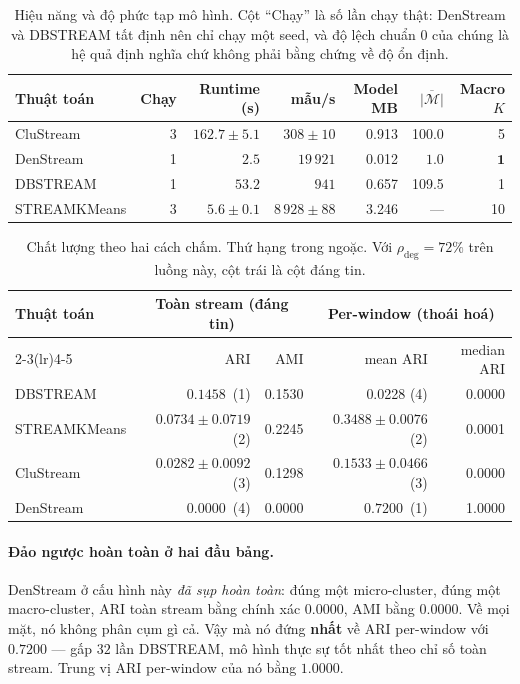 \documentclass[11pt,a4paper]{article}
\theoremstyle{remark}
\begin{document}
\begin{table}[htbp]
\centering
\small
\caption{Hiệu năng và độ phức tạp mô hình. Cột ``Chạy'' là số lần chạy thật:
DenStream và DBSTREAM tất định nên chỉ chạy một seed, và độ lệch chuẩn $0$ của
chúng là hệ quả định nghĩa chứ không phải bằng chứng về độ ổn định.}
\label{tab:fullperf}
\begin{tabular}{@{}lrrrrrr@{}}
\toprule
\textbf{Thuật toán} & \textbf{Chạy} & \textbf{Runtime (s)} & \textbf{mẫu/s}
 & \textbf{Model MB} & $\overline{|\mathcal{M}|}$ & \textbf{Macro} $K$ \\
\midrule
CluStream    & 3 & $162.7 \pm 5.1$ & $308 \pm 10$    & 0.913 & 100.0 & 5 \\
DenStream    & 1 & $2.5$           & $19\,921$       & 0.012 & $\mathbf{1.0}$ & $\mathbf{1}$ \\
DBSTREAM     & 1 & $53.2$          & $941$           & 0.657 & 109.5 & 1 \\
STREAMKMeans & 3 & $5.6 \pm 0.1$   & $8\,928 \pm 88$ & 3.246 & --- & 10 \\
\bottomrule
\end{tabular}
\end{table}

\begin{table}[htbp]
\centering
\small
\caption{Chất lượng theo hai cách chấm. Thứ hạng trong ngoặc. Với
$\rho_{\text{deg}}=72\%$ trên luồng này, cột trái là cột đáng tin.}
\label{tab:fullquality}
\begin{tabular}{@{}lrrrr@{}}
\toprule
\multirow{2}{*}{\textbf{Thuật toán}}
 & \multicolumn{2}{c}{\textbf{Toàn stream (đáng tin)}}
 & \multicolumn{2}{c}{\textbf{Per-window (thoái hoá)}} \\
\cmidrule(lr){2-3}\cmidrule(lr){4-5}
 & ARI & AMI & mean ARI & median ARI \\
\midrule
DBSTREAM     & $\mathbf{0.1458}$~(1) & 0.1530 & 0.0228 \;(4) & 0.0000 \\
STREAMKMeans & $0.0734 \pm 0.0719$~(2) & 0.2245 & $0.3488 \pm 0.0076$~(2) & 0.0001 \\
CluStream    & $0.0282 \pm 0.0092$~(3) & 0.1298 & $0.1533 \pm 0.0466$~(3) & 0.0000 \\
DenStream    & $\mathbf{0.0000}$~(4) & 0.0000 & $\mathbf{0.7200}$~(1) & 1.0000 \\
\bottomrule
\end{tabular}
\end{table}

\paragraph{Đảo ngược hoàn toàn ở hai đầu bảng.}
DenStream ở cấu hình này \emph{đã sụp hoàn toàn}: đúng một micro-cluster, đúng
một macro-cluster, ARI toàn stream bằng chính xác $0.0000$, AMI bằng $0.0000$.
Về mọi mặt, nó không phân cụm gì cả. Vậy mà nó đứng \textbf{nhất} về ARI
per-window với $0.7200$ --- gấp $32$ lần DBSTREAM, mô hình thực sự tốt nhất
theo chỉ số toàn stream. Trung vị ARI per-window của nó bằng $1.0000$.
\end{document}
